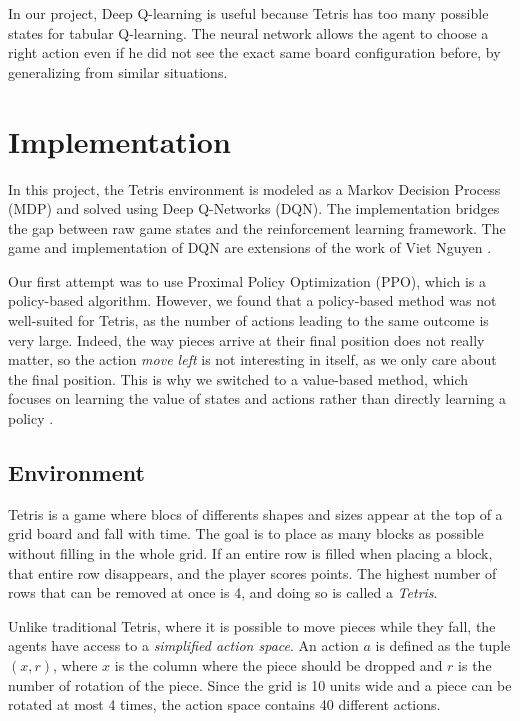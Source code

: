 \documentclass[12pt]{article}
\begin{document}
In our project, Deep Q-learning is useful because Tetris has too many possible states for tabular Q-learning. The neural network allows the agent to choose a right action even if he did not see the exact same board configuration before, by generalizing from similar situations.

\section{Implementation }

In this project, the Tetris environment is modeled as a Markov Decision Process (MDP) and solved using Deep Q-Networks (DQN). The implementation bridges the gap between raw game states and the reinforcement learning framework. The game and implementation of DQN are extensions of the work of Viet Nguyen \autocite{tetrisVietnhGithub}.

Our first attempt was to use Proximal Policy Optimization (PPO), which is a policy-based algorithm. However, we found that a policy-based method was not well-suited for Tetris, as the number of actions leading to the same outcome is very large. Indeed, the way pieces arrive at their final position does not really matter, so the action \textit{move left} is not interesting in itself, as we only care about the final position. This is why we switched to a value-based method, which focuses on learning the value of states and actions rather than directly learning a policy \autocite{policybased}.

\subsection{Environment}

Tetris is a game where blocs of differents shapes and sizes appear at the top of a grid board and fall with time. The goal is to place as many blocks as possible without filling in the whole grid. If an entire row is filled when placing a block, that entire row disappears, and the player scores points. The highest number of rows that can be removed at once is 4, and doing so is called a \textit{Tetris}.

Unlike traditional Tetris, where it is possible to move pieces while they fall, the agents have access to a \textit{simplified action space}. An action $a$ is defined as the tuple $(x, r)$, where $x$ is the column where the piece should be dropped and $r$ is the number of rotation of the piece. Since the grid is 10 units wide and a piece can be rotated at most 4 times, the action space contains 40 different actions. 
\end{document}
